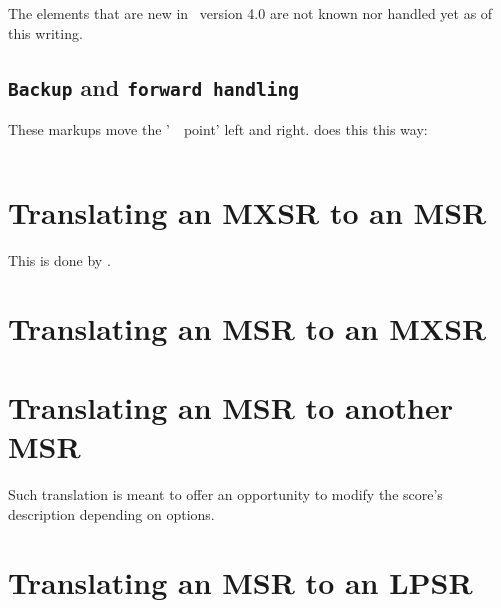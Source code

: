 The elements that are new in \mxml\ version 4.0 are not known nor handled yet as of this writing.


\subsection{{\tt Backup} and {\tt forward handling}}\label{{Backup} and {forward handling}}

These markups move the '\mxml\ \drawing\ point' left and right.  does this this way:
\begin{lstlisting}[language=CPlusPlus]

\end{lstlisting}



\section{Translating an MXSR to an MSR}

This is done by .


\section{Translating an MSR to an MXSR}


\section{Translating an MSR to another MSR}

Such translation is meant to offer an opportunity to modify the score's description depending on options.


\section{Translating an MSR to an LPSR}

